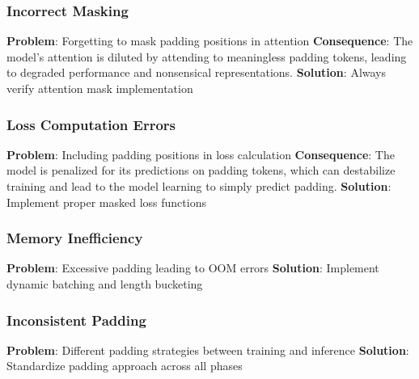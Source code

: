 \subsubsection{Incorrect Masking}
\textbf{Problem}: Forgetting to mask padding positions in attention
\textbf{Consequence}: The model's attention is diluted by attending to meaningless padding tokens, leading to degraded performance and nonsensical representations.
\textbf{Solution}: Always verify attention mask implementation

\subsubsection{Loss Computation Errors}
\textbf{Problem}: Including padding positions in loss calculation
\textbf{Consequence}: The model is penalized for its predictions on padding tokens, which can destabilize training and lead to the model learning to simply predict padding.
\textbf{Solution}: Implement proper masked loss functions

\subsubsection{Memory Inefficiency}
\textbf{Problem}: Excessive padding leading to OOM errors
\textbf{Solution}: Implement dynamic batching and length bucketing

\subsubsection{Inconsistent Padding}
\textbf{Problem}: Different padding strategies between training and inference
\textbf{Solution}: Standardize padding approach across all phases

